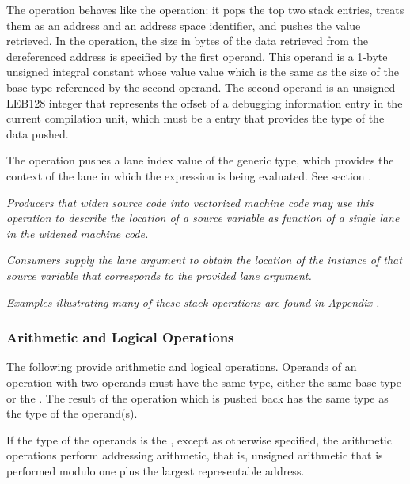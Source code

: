 \begin{enumerate}[1. ]
\itembfnl{\DWOPxdereftypeTARG}
The \DWOPxdereftypeNAME{} operation behaves like the \DWOPxderefsize{}
operation: it pops the top two stack entries, treats them as an address and
an address space identifier, and pushes the value retrieved. In the
\DWOPxdereftypeNAME{} operation, the size in bytes of the data retrieved from
the dereferenced address is specified by the first operand. This operand is
a 1-byte unsigned integral constant whose value
value which is the same as the size of the base type referenced
by the second operand. The second
operand is an unsigned LEB128 integer that represents the offset of a
debugging information entry in the current compilation unit, which must be a
\DWTAGbasetype{} entry that provides the type of the data pushed.


\bb
\itembfnl{\DWOPpushlaneTARG}
The \DWOPpushlaneNAME{} operation pushes a lane index value
of the generic type, which provides the context of the lane in
which the expression is being evaluated.
See section .

\textit{Producers that widen source code into vectorized machine
code may use this operation to describe the location of a source
variable as function of a single lane in the widened machine code.}

\textit{Consumers supply the lane argument to obtain the
location of the instance of that source variable that corresponds
to the provided lane argument.}
\eb

\end{enumerate}

\textit{Examples illustrating many of these stack operations are
found in Appendix .}

\subsubsection{Arithmetic and Logical Operations}
The following provide arithmetic and logical operations.
Operands of an operation with two operands
must have the same type,
either the same base type or the \generictype.
The result of the operation which is pushed back has the same type
as the type of the operand(s).

If the type of the operands is the \generictype,
except as otherwise specified, the arithmetic operations
perform addressing arithmetic, that is, unsigned arithmetic that is performed
modulo one plus the largest representable address.

